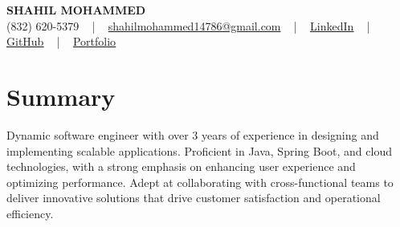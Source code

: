 \documentclass[letterpaper,10pt]{article}
\begin{document}
\begin{center}
    {\fontsize{14pt}{12pt}\selectfont \textbf{\MakeUppercase{Shahil Mohammed}}}\\ \vspace{2pt}
    \fontsize{10pt}{12pt}\selectfont (832) 620-5379 ~ | ~ \href{mailto:shahilmohammed14786@gmail.com}{shahilmohammed14786@gmail.com} ~ | ~  
    \href{https://www.linkedin.com/in/shahil-mohammed-9652931a1/}{\color{blue}\underline{LinkedIn}}  ~ | ~ 
    \href{https://github.com/freakbeast14}{\color{blue}\underline{GitHub}} ~ | ~ 
    \href{https://shahil-mohammed.netlify.app/}{\color{blue}\underline{Portfolio}}
    \vspace{-8pt}
\end{center}

\section{Summary}
\vspace{-2pt}\fontsize{8pt}{9pt}\selectfont
Dynamic software engineer with over 3 years of experience in designing and implementing scalable applications. Proficient in Java, Spring Boot, and cloud technologies, with a strong emphasis on enhancing user experience and optimizing performance. Adept at collaborating with cross-functional teams to deliver innovative solutions that drive customer satisfaction and operational efficiency.
 \vspace{-5pt}
 
\vspace{-2pt}
\end{document}
